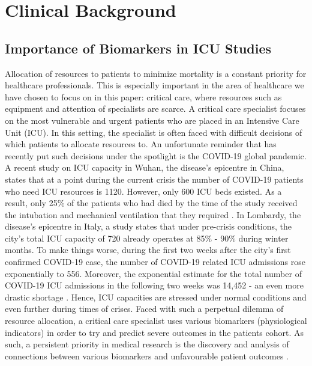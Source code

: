 
\chapter{Clinical Background} %

\label{chapter1} %


\section{Importance of Biomarkers in ICU Studies}

Allocation of resources to patients to minimize mortality is a constant priority for healthcare professionals. This is especially important in the area of healthcare we have chosen to focus on in this paper: critical care,  where resources such as equipment and attention of specialists are  scarce. A critical care specialist focuses on the most vulnerable and urgent patients who are placed in an Intensive Care Unit (ICU). In this setting, the specialist is often faced with difficult decisions of which patients to allocate resources to. An unfortunate reminder that has recently put such decisions under the spotlight is the COVID-19 global pandemic. A recent study on ICU capacity in Wuhan, the disease's epicentre in China, states that at a point during the current crisis the number of COVID-19 patients who need ICU resources is 1120. However, only 600 ICU beds existed. As a result, only 25\% of the patients who had died by the time of the study received the intubation and mechanical ventilation that they required \citep{wu2020characteristics}. In Lombardy, the disease's epicentre in Italy, a study states that under pre-crisis conditions,  the city's  total ICU capacity of 720 already operates at 85\% - 90\% during winter months. To make things worse, during the first two weeks after the city's first confirmed COVID-19 case, the number of COVID-19 related ICU admissions rose exponentially to 556. Moreover, the exponential estimate for the total number of COVID-19 ICU admissions in the following two weeks was 14,452 - an even more drastic shortage \citep{grasselli2020}. Hence, ICU capacities are stressed under normal conditions and even further during times of crises.  Faced with such a perpetual dilemma of resource allocation, a critical care specialist uses various biomarkers (physiological indicators) in order to try and predict severe outcomes in the patients cohort. As such, a persistent priority in medical research is the discovery and analysis of connections between various biomarkers and unfavourable patient outcomes \citep{ware2017biomarkers}. 

